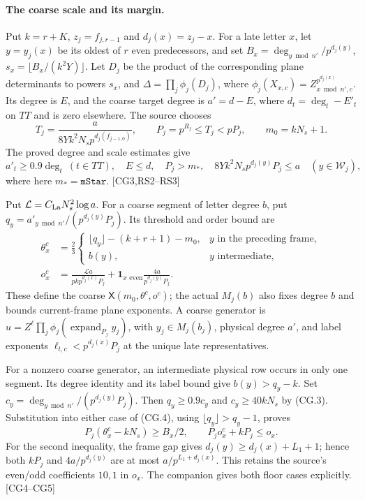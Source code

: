 \documentclass[11pt,a4paper]{article}
\numberwithin{equation}{section}
\theoremstyle{remark}\newtheorem{remark}[theorem]{Remark}
\begin{document}
\paragraph{The coarse scale and its margin.}
Put $k=r+K$, $z_j=f_{j,r-1}$ and $d_j(x)=z_j-x$. For a late letter $x$,
let $y=y_j(x)$ be its oldest of $r$ even predecessors, and set
$B_x=\deg_{y\bmod n'}/p^{d_j(y)}$, $s_x=\lfloor B_x/(k^2Y)\rfloor$.
Let $D_j$ be the product of the corresponding plane determinants to
powers $s_x$, and $\Delta=\prod_j\phi_j(D_j)$, where
$\phi_j(X_{x,c})=Z_{x\bmod n',c}^{p^{d_j(x)}}$.
Its degree is $E$, and the coarse target degree is $a'=d-E$, where
$d_t=\deg_t-E'_t$ on $TT$ and is zero elsewhere.
The source chooses
\[
 T_j=\frac{a}{8Yk^2N_s p^{d_j(f_{j-1,0})}},\qquad
 P_j=p^{R_j}\le T_j<pP_j,\qquad m_0=kN_s+1.           \tag{CG.2}
\]
The proved degree and scale estimates give
\[
 a'_t\ge0.9\deg_t\ (t\in TT),\quad E\le d,\quad P_j>m_*,\quad
 8Yk^2N_s p^{d_j(y)}P_j\le a\quad(y\in\mathcal W_j),  \tag{CG.3}
\]
where here $m_*=\texttt{mStar}$. \textsf{[CG3,RS2--RS3]}

Put $\mathcal L=C_{\rm La}N_s^2\log a$. For a coarse segment of letter degree $b$, put
$q_y=a'_{y\bmod n'}/(p^{d_j(y)}P_j)$. Its threshold and order bound are
\[
\begin{aligned}
 \theta^c_x&=\frac23
 \begin{cases}
  \lfloor q_y\rfloor-(k+r+1)-m_0,&y\text{ in the preceding frame},\\
  b(y),&y\text{ intermediate},
 \end{cases}\\
 o^c_x&=\frac{\mathcal L a}{pkp^{d_j(x)}P_j}
       +\mathbf1_{x\text{ even}}\frac{4a}{p^{d_j(y)}P_j}.
\end{aligned}                                                    \tag{CG.4}
\]
These define the coarse $\mathsf X(m_0,\theta^c,o^c)$; the actual
$M_j(b)$ also fixes degree $b$ and bounds current-frame plane exponents.
A coarse generator is
$u=Z^\ell\prod_j\phi_j(\operatorname{expand}_{P_j}y_j)$, with
$y_j\in M_j(b_j)$, physical degree $a'$, and label exponents
$\ell_{t,c}<p^{d_j(x)}P_j$ at the unique late representatives.

For a nonzero coarse generator, an intermediate physical row occurs
in only one segment. Its degree identity and its label bound give
$b(y)>q_y-k$. Set $c_y=\deg_{y\bmod n'}/(p^{d_j(y)}P_j)$.
Then $q_y\ge0.9c_y$ and $c_y\ge40kN_s$ by (CG.3).
Substitution into either case of (CG.4), using
$\lfloor q_y\rfloor>q_y-1$, proves
\[
 P_j(\theta^c_x-kN_s)\ge B_x/2,
 \qquad P_j o^c_x+kP_j\le o_x.                       \tag{CG.5}
\]
For the second inequality, the frame gap gives
$d_j(y)\ge d_j(x)+L_1+1$; hence both $kP_j$ and
$4a/p^{d_j(y)}$ are at most $a/p^{L_1+d_j(x)}$.
This retains the source's even/odd coefficients $10,1$ in $o_x$.
The companion gives both floor cases explicitly. \textsf{[CG4--CG5]}
\end{document}
